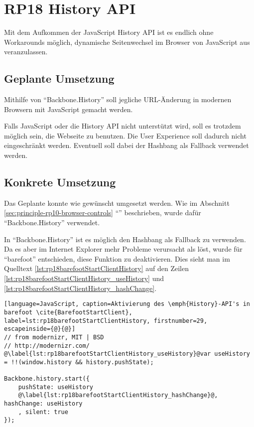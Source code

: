 \section{RP18 History API}
\label{sec:principle-rp18-history-api}

Mit dem Aufkommen der JavaScript History API \cite{HistoryAPI} ist es endlich ohne Workarounds möglich, dynamische Seitenwechsel im Browser von JavaScript aus veranzulassen.

\subsection*{Geplante Umsetzung}
Mithilfe von ``Backbone.History'' \cite{BackbonejsHistory} soll jegliche URL-Änderung in modernen Browsern mit JavaScript gemacht werden.

Falls JavaScript oder die History API nicht unterstützt wird, soll es trotzdem möglich sein, die Webseite zu benutzen. Die User Experience soll dadurch nicht eingeschränkt werden. Eventuell soll dabei der \gls{Hashbang} als Fallback verwendet werden.

\subsection*{Konkrete Umsetzung}
Das Geplante konnte wie gewünscht umgesetzt werden. Wie im Abschnitt \ref{sec:principle-rp10-browser-controls} ``'' beschrieben, wurde dafür ``Backbone.History'' verwendet.

In ``Backbone.History'' ist es möglich den Hashbang als Fallback zu verwenden. Da es aber im Internet Explorer mehr Probleme verursacht als löst, wurde für ``barefoot'' entschieden, diese Funktion zu deaktivieren. Dies sieht man im Quelltext \ref{lst:rp18barefootStartClientHistory} auf den Zeilen \ref{lst:rp18barefootStartClientHistory_useHistory} und \ref{lst:rp18barefootStartClientHistory_hashChange}.

\begin{lstlisting}[language=JavaScript, caption=Aktivierung des \emph{History}-API's in barefoot \cite{BarefootStartClient}, label=lst:rp18barefootStartClientHistory, firstnumber=29, escapeinside={@}{@}]
// from modernizr, MIT | BSD
// http://modernizr.com/
@\label{lst:rp18barefootStartClientHistory_useHistory}@var useHistory = !!(window.history && history.pushState);

Backbone.history.start({
	pushState: useHistory
	@\label{lst:rp18barefootStartClientHistory_hashChange}@, hashChange: useHistory
	, silent: true
});
\end{lstlisting}

